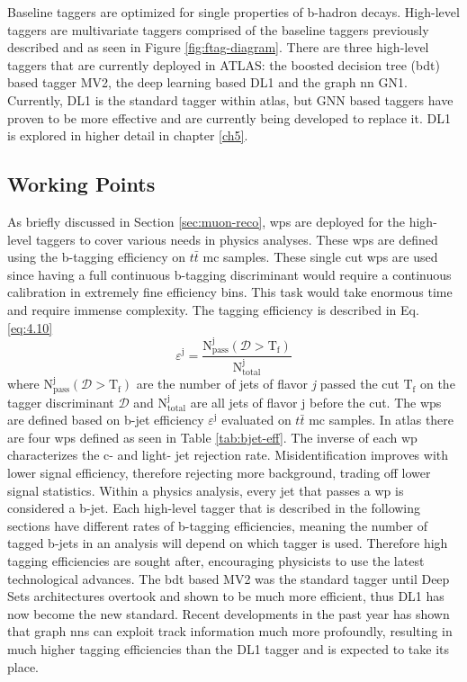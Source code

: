 Baseline taggers are optimized for single properties of b-hadron decays. High-level taggers are multivariate taggers comprised of the baseline taggers previously described 
and as seen in Figure \ref{fig:ftag-diagram}. There are three high-level taggers that are currently deployed in ATLAS: the boosted decision tree (\gls{bdt}) based tagger MV2, 
the deep learning based DL1 and the graph \gls{nn} GN1. Currently, DL1 is the standard tagger within \gls{atlas}, but GNN based taggers have proven to be more effective and are currently being developed to replace it. DL1 is 
explored in higher detail in chapter \ref{ch5}. 

\subsection{Working Points}

As briefly discussed in Section \ref{sec:muon-reco}, \gls{wp}s are deployed for the high-level taggers to cover various needs in physics analyses. These \gls{wp}s are defined using 
the b-tagging efficiency on $t\bar{t}$ \gls{mc} samples. These single cut \gls{wp}s are used since having a full continuous b-tagging discriminant would require a continuous 
calibration in extremely fine efficiency bins. This task would take enormous time and require immense complexity. The tagging efficiency is described in Eq. \ref{eq:4.10}
%
\begin{equation}\label{eq:4.10}
    \varepsilon^{\textrm{j}} = \frac{\textrm{N}^{\textrm{j}}_{\textrm{pass}}(\mathcal{D} > \textrm{T}_\textrm{f})}{\textrm{N}^{\textrm{j}}_{\textrm{total}}} 
\tag{4.10}
\end{equation}
%
where $\textrm{N}^{\textrm{j}}_{\textrm{pass}}(\mathcal{D} > \textrm{T}_\textrm{f})$ are the number of jets of flavor \textit{j} passed the cut $\textrm{T}_{\textrm{f}}$ on the tagger 
discriminant $\mathcal{D}$ and $\textrm{N}^{\textrm{j}}_{\textrm{total}}$ are all jets of flavor j before the cut. The \gls{wp}s are defined based on b-jet efficiency $\varepsilon^{\textrm{j}}$
evaluated on $t\bar{t}$ \gls{mc} samples. In \gls{atlas} there are four \gls{wp}s defined as seen in Table \ref{tab:bjet-eff}. The inverse of each \gls{wp} characterizes the c- and light- jet rejection rate.
Misidentification improves with lower signal efficiency, therefore rejecting more background, trading off lower signal statistics. Within a physics analysis, every jet that passes a 
\gls{wp} is considered a b-jet. Each high-level tagger that is described in the following sections have different rates of b-tagging efficiencies, meaning the number of tagged 
b-jets in an analysis will depend on which tagger is used. Therefore high tagging efficiencies are sought after, encouraging physicists to use the latest technological advances.
The \gls{bdt} based MV2 was the standard tagger until Deep Sets architectures overtook and shown to be much more efficient, thus DL1 has now become the new standard. 
Recent developments in the past year has shown that graph \gls{nn}s can exploit track information much more profoundly, resulting in much higher tagging efficiencies than 
the DL1 tagger and is expected to take its place.

